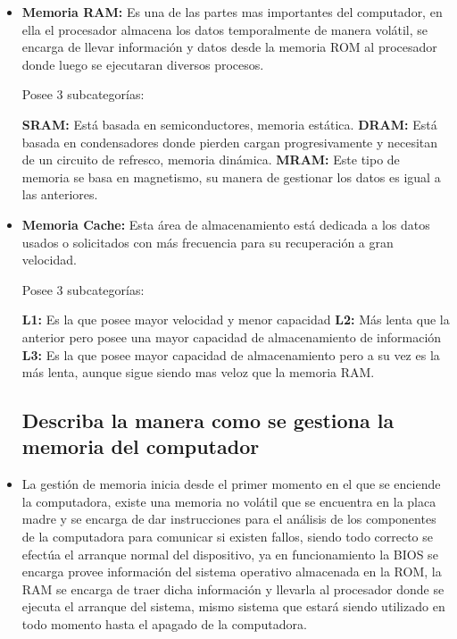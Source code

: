 \begin{itemize}
    \item \textbf{Memoria RAM: } Es una de las partes mas importantes del computador, en ella el procesador almacena los datos temporalmente de manera volátil, se encarga de llevar información y datos desde la memoria ROM al procesador donde luego se ejecutaran diversos procesos.
    
    Posee 3 subcategorías:
    
    \textbf{SRAM:} Está basada en semiconductores, memoria estática. \newline
    \textbf{DRAM:} Está basada en condensadores donde pierden cargan progresivamente y necesitan de un circuito de refresco, memoria dinámica. \newline
    \textbf{MRAM:} Este tipo de memoria se basa en magnetismo, su manera de gestionar los datos es igual a las anteriores. \newline
    
    \item \textbf{Memoria Cache: } Esta área de almacenamiento está dedicada a los datos usados o solicitados con más frecuencia para su recuperación a gran velocidad.
    
    Posee 3 subcategorías:
    
    \textbf{L1:} Es la que posee mayor velocidad y menor capacidad \newline
    \textbf{L2:} Más lenta que la anterior pero posee una mayor capacidad de almacenamiento de información \newline
    \textbf{L3:} Es la que posee mayor capacidad de almacenamiento pero a su vez es la más lenta, aunque sigue siendo mas veloz que la memoria RAM. \newline
    
    
    \subsection{ Describa la manera como se gestiona la memoria del computador}
    \item La gestión de memoria inicia desde el primer momento en el que se enciende la computadora, existe una memoria no volátil que se encuentra en la placa madre y se encarga de dar instrucciones para el análisis de los componentes de la computadora para comunicar si existen fallos, siendo todo correcto se efectúa el arranque normal del dispositivo, ya en funcionamiento la BIOS se encarga provee información del sistema operativo almacenada en la ROM, la RAM se encarga de traer dicha información y llevarla al procesador donde se ejecuta el arranque del sistema, mismo sistema que estará siendo utilizado en todo momento hasta el apagado de la computadora.
    

\end{itemize}
